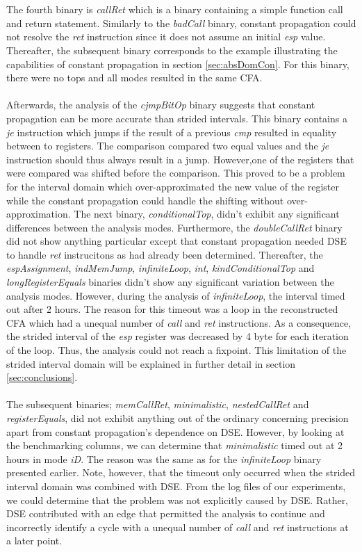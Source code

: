 \documentclass{kththesis}
\renewcommand{\it}[1]{\textit{#1}}
\begin{document}
\\ \\
The fourth binary is \it{callRet} which is a binary containing a simple function call and return statement. Similarly to the \it{badCall} binary, constant propagation could not resolve the \it{ret} instruction since it does not assume an initial \it{esp} value. Thereafter, the subsequent binary corresponds to the example illustrating the capabilities of constant propagation in section \ref{sec:absDomCon}. For this binary, there were no tops and all modes resulted in the same CFA.
\\ \\
Afterwards, the analysis of the \it{cjmpBitOp} binary suggests that constant propagation can be more accurate than strided intervals. This binary contains a \it{je} instruction which jumps if the result of a previous \it{cmp} resulted in equality between to registers. The comparison compared two equal values and the \it{je} instruction should thus always result in a jump. However,one of the registers that were compared was shifted before the comparison. This proved to be a problem for the interval domain which over-approximated the new value of the register while the constant propagation could handle the shifting without over-approximation.
\clearpage
\noindent
The next binary, \it{conditionalTop}, didn't exhibit any significant differences between the analysis modes. Furthermore, the \it{doubleCallRet} binary did not show anything particular except that constant propagation needed DSE to handle \it{ret} instrucitons as had already been determined. Thereafter, the \it{espAssignment}, \it{indMemJump}, \it{infiniteLoop}, \it{int}, \it{kindConditionalTop} and \it{longRegisterEquals} binaries didn't show any significant variation between the analysis modes. However, during the analysis of \it{infiniteLoop}, the interval timed out after 2 hours. The reason for this timeout was a loop in the reconstructed CFA which had a unequal number of \it{call} and \it{ret} instructions. As a consequence, the strided interval of the \it{esp} register was decreased by 4 byte for each iteration of the loop. Thus, the analysis could not reach a fixpoint. This limitation of the strided interval domain will be explained in further detail in section \ref{sec:conclusions}.
\\ \\ 
The subsequent binaries; \it{memCallRet}, \it{minimalistic}, \it{nestedCallRet} and \it{registerEquals}, did not exhibit anything out of the ordinary concerning precision apart from constant propagation's dependence on DSE. However, by looking at the benchmarking columns, we can determine that \it{minimalistic} timed out at 2 hours in mode \it{iD}. The reason was the same as for the \it{infiniteLoop} binary presented earlier. Note, however, that the timeout only occurred when the strided interval domain was combined with DSE. From the log files of our experiments, we could determine that the problem was not explicitly caused by DSE. Rather, DSE contributed with an edge that permitted the analysis to continue and incorrectly identify a cycle with a unequal number of \it{call} and \it{ret} instructions at a later point. 
\end{document}
